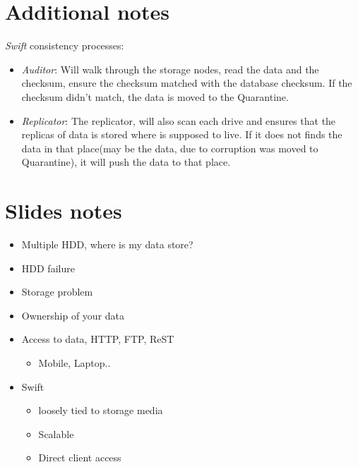 \documentclass{article}
\begin{document}
\section{Additional notes}
\label{sec-4}
\emph{Swift} consistency processes:
\begin{itemize}
\item \emph{Auditor}: Will walk through the storage nodes, read the data and
the checksum, ensure the checksum matched with the database
checksum. If the checksum didn't match, the data is moved to the
Quarantine.
\item \emph{Replicator}: The replicator, will also scan each drive and
ensures that the replicas of data is stored where is supposed to
live. If it does not finds the data in that place(may be the
data, due to corruption was moved to Quarantine), it will push
the data to that place.
\end{itemize}

\section{Slides notes}
\label{sec-5}
\begin{itemize}
\item Multiple HDD, where is my data store?
\item HDD failure
\item Storage problem

\item Ownership of your data
\item Access to data, HTTP, FTP, ReST
\begin{itemize}
\item Mobile, Laptop..
\end{itemize}

\item Swift
\begin{itemize}
\item loosely tied to storage media
\item Scalable
\item Direct client access
\end{itemize}
\end{itemize}
\end{document}
